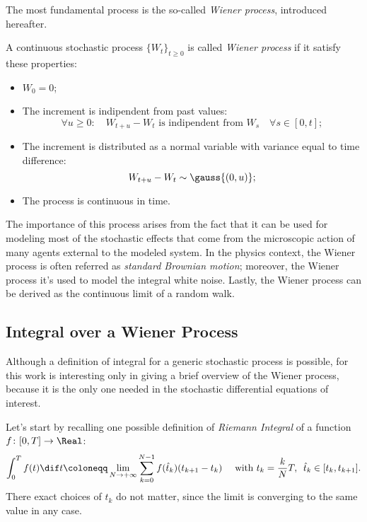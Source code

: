 The most fundamental process is the so-called \emph{Wiener process}, introduced hereafter.
\begin{Definition}
  A continuous stochastic process \(\{W_t\}_{t\ge0}\) is called \emph{Wiener process} if it satisfy these properties:
  \begin{itemize}
    \item \(W_0 = 0\);
    \item The increment is indipendent from past values:
          \[\forall u\ge0: \quad W_{t+u} - W_t  \text{ is indipendent from } W_s \quad \forall s\in[0,t];\]
    \item The increment is distributed as a normal variable with variance equal to time difference:
          \[W_{t+u}-W_t \sim \gauss{(0,u)};\]
    \item The process is continuous in time.
  \end{itemize}
\end{Definition}
The importance of this process arises from the fact that it can be used for modeling
most of the stochastic effects that come from the microscopic action of many agents
external to the modeled system.
In the physics context, the Wiener process is often referred as \emph{standard Brownian motion};
moreover, the Wiener process it's used to model the integral white noise.
Lastly, the Wiener process can be derived as the continuous limit of a random walk.

\subsection{Integral over a Wiener Process}
Although a definition of integral for a generic stochastic process is possible,
for this work is interesting only in giving a brief overview of the Wiener process,
because it is the only one needed in the stochastic differential equations of interest.

Let's start by recalling one possible definition of \emph{Riemann Integral} 
of a function \(f\colon[0,T]\to\Real\):
\[
  \int_0^T f{(t)}\dif t \coloneqq \lim_{N\to+\infty} \sum_{k=0}^{N-1}f{(\hat{t}_k)}(t_{k+1}-t_k)
  \quad \text{ with } t_k = \frac{k}{N}T,\,\,\, \hat{t}_k \in [t_k, t_{k+1}].
\]
There exact choices of \(\hat{t}_k\) do not matter, since the limit is converging 
to the same value in any case.

